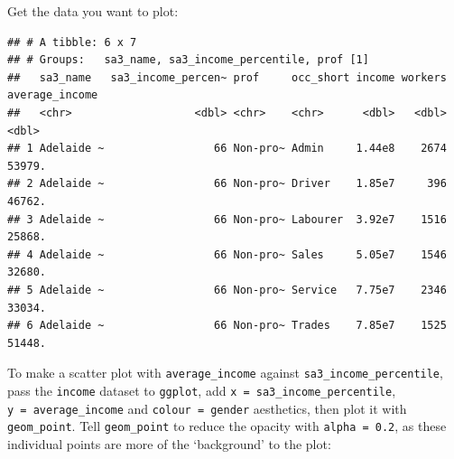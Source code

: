 \documentclass[]{book}
\newenvironment{Shaded}{\begin{snugshade}}{\end{snugshade}}
\newcommand{\DataTypeTok}[1]{\textcolor[rgb]{0.13,0.29,0.53}{#1}}
\newcommand{\DecValTok}[1]{\textcolor[rgb]{0.00,0.00,0.81}{#1}}
\newcommand{\KeywordTok}[1]{\textcolor[rgb]{0.13,0.29,0.53}{\textbf{#1}}}
\newcommand{\NormalTok}[1]{#1}
\newcommand{\OperatorTok}[1]{\textcolor[rgb]{0.81,0.36,0.00}{\textbf{#1}}}
\newcommand{\StringTok}[1]{\textcolor[rgb]{0.31,0.60,0.02}{#1}}
\begin{document}
Get the data you want to plot:

\begin{Shaded}
\end{Shaded}

\begin{verbatim}
## # A tibble: 6 x 7
## # Groups:   sa3_name, sa3_income_percentile, prof [1]
##   sa3_name   sa3_income_percen~ prof     occ_short income workers average_income
##   <chr>                   <dbl> <chr>    <chr>      <dbl>   <dbl>          <dbl>
## 1 Adelaide ~                 66 Non-pro~ Admin     1.44e8    2674         53979.
## 2 Adelaide ~                 66 Non-pro~ Driver    1.85e7     396         46762.
## 3 Adelaide ~                 66 Non-pro~ Labourer  3.92e7    1516         25868.
## 4 Adelaide ~                 66 Non-pro~ Sales     5.05e7    1546         32680.
## 5 Adelaide ~                 66 Non-pro~ Service   7.75e7    2346         33034.
## 6 Adelaide ~                 66 Non-pro~ Trades    7.85e7    1525         51448.
\end{verbatim}

To make a scatter plot with \texttt{average\_income} against \texttt{sa3\_income\_percentile}, pass the \texttt{income} dataset to \texttt{ggplot}, add \texttt{x\ =\ sa3\_income\_percentile}, \texttt{y\ =\ average\_income} and \texttt{colour\ =\ gender} aesthetics, then plot it with \texttt{geom\_point}. Tell \texttt{geom\_point} to reduce the opacity with \texttt{alpha\ =\ 0.2}, as these individual points are more of the `background' to the plot:
\end{document}

